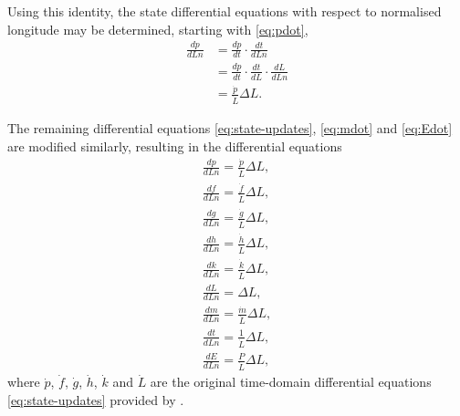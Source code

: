 Using this identity, the state differential equations with respect to normalised longitude may be determined, starting with \eqref{eq:pdot},
\begin{subequations}\label{eq:dpdLn}
\begin{align}
\frac{dp}{dLn}&=\frac{dp}{dt}\cdot\frac{dt}{dLn}\\
&=\frac{dp}{dt}\cdot\frac{dt}{dL}\cdot\frac{dL}{dLn}\\
&=\frac{\dot{p}}{\dot{L}}\Delta L.
\end{align}
\end{subequations}

The remaining differential equations \eqref{eq:state-updates}, \eqref{eq:mdot} and \eqref{eq:Edot} are modified similarly, resulting in the differential equations
\begin{subequations} \label{eq:dLn}
\begin{gather}
\frac{dp}{dLn}=\frac{\dot{p}}{\dot{L}}\Delta L, \\
\frac{df}{dLn}=\frac{\dot{f}}{\dot{L}}\Delta L, \\
\frac{dg}{dLn}=\frac{\dot{g}}{\dot{L}}\Delta L, \\
\frac{dh}{dLn}=\frac{\dot{h}}{\dot{L}}\Delta L, \\
\frac{dk}{dLn}=\frac{\dot{k}}{\dot{L}}\Delta L, \\
\frac{dL}{dLn}=\Delta L, \\
\frac{dm}{dLn}=\frac{\dot{m}}{\dot{L}}\Delta L, \\
\frac{dt}{dLn}=\frac{1}{\dot{L}}\Delta L, \\
\frac{dE}{dLn}=\frac{P}{\dot{L}}\Delta L,
\end{gather}
\end{subequations}
where $\dot{p}$, $\dot{f}$,  $\dot{g}$, $\dot{h}$, $\dot{k}$ and $\dot{L}$ are the original time-domain differential equations \eqref{eq:state-updates} provided by \textcite{Walker1985}.

